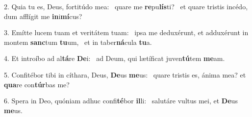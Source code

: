 2. Quia tu es, Deus, fortitúdo mea: \dag\  quare me \textbf{re}pu\textbf{lís}ti? \ast\  et quare tristis incédo, dum afflígit me \textbf{in}i\textbf{mí}cus?\

3. Emítte lucem tuam et veritátem tuam: \dag\  ipsa me deduxérunt, et adduxérunt in montem \textbf{sanc}tum \textbf{tu}um, \ast\  et in taber\textbf{ná}cula \textbf{tu}a.\

4. Et introíbo ad al\textbf{tá}re \textbf{De}i: \ast\  ad Deum, qui lætíficat juven\textbf{tú}tem \textbf{me}am.\

5. Confitébor tibi in cíthara, Deus, \textbf{De}us \textbf{me}us: \ast\  quare tristis es, ánima mea? et \textbf{qua}re con\textbf{túr}bas me?\

6. Spera in Deo, quóniam adhuc confi\textbf{té}bor \textbf{il}li: \ast\  salutáre vultus mei, et \textbf{De}us \textbf{me}us.\

